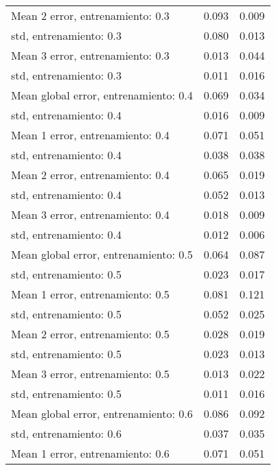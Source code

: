\begin{longtable}{p{4cm}|p{1.5cm}|p{1.5cm}}
Mean 2 error, entrenamiento: 0.3      &              0.093 &        0.009 \\
std, entrenamiento: 0.3               &              0.080 &        0.013 \\
Mean 3 error, entrenamiento: 0.3      &              0.013 &        0.044 \\
std, entrenamiento: 0.3               &              0.011 &        0.016 \\
Mean global error, entrenamiento: 0.4 &              0.069 &        0.034 \\
std, entrenamiento: 0.4               &              0.016 &        0.009 \\
Mean 1 error, entrenamiento: 0.4      &              0.071 &        0.051 \\
std, entrenamiento: 0.4               &              0.038 &        0.038 \\
Mean 2 error, entrenamiento: 0.4      &              0.065 &        0.019 \\
std, entrenamiento: 0.4               &              0.052 &        0.013 \\
Mean 3 error, entrenamiento: 0.4      &              0.018 &        0.009 \\
std, entrenamiento: 0.4               &              0.012 &        0.006 \\
Mean global error, entrenamiento: 0.5 &              0.064 &        0.087 \\
std, entrenamiento: 0.5               &              0.023 &        0.017 \\
Mean 1 error, entrenamiento: 0.5      &              0.081 &        0.121 \\
std, entrenamiento: 0.5               &              0.052 &        0.025 \\
Mean 2 error, entrenamiento: 0.5      &              0.028 &        0.019 \\
std, entrenamiento: 0.5               &              0.023 &        0.013 \\
Mean 3 error, entrenamiento: 0.5      &              0.013 &        0.022 \\
std, entrenamiento: 0.5               &              0.011 &        0.016 \\
Mean global error, entrenamiento: 0.6 &              0.086 &        0.092 \\
std, entrenamiento: 0.6               &              0.037 &        0.035 \\
Mean 1 error, entrenamiento: 0.6      &              0.071 &        0.051 \\

\end{longtable}
